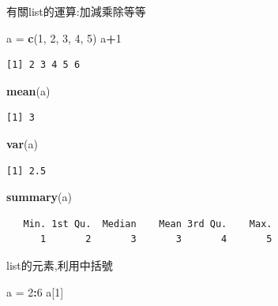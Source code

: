 \documentclass[]{book}
\newenvironment{Shaded}{\begin{snugshade}}{\end{snugshade}}
\newcommand{\DecValTok}[1]{\textcolor[rgb]{0.00,0.00,0.81}{#1}}
\newcommand{\KeywordTok}[1]{\textcolor[rgb]{0.13,0.29,0.53}{\textbf{#1}}}
\newcommand{\NormalTok}[1]{#1}
\newcommand{\OperatorTok}[1]{\textcolor[rgb]{0.81,0.36,0.00}{\textbf{#1}}}
\newcommand{\StringTok}[1]{\textcolor[rgb]{0.31,0.60,0.02}{#1}}
\theoremstyle{definition}
\theoremstyle{definition}
\theoremstyle{definition}
\theoremstyle{remark}
\begin{document}
有關list的運算:加減乘除等等

\begin{Shaded}
\begin{Highlighting}[]
\NormalTok{a =}\StringTok{ }\KeywordTok{c}\NormalTok{(}\DecValTok{1}\NormalTok{, }\DecValTok{2}\NormalTok{, }\DecValTok{3}\NormalTok{, }\DecValTok{4}\NormalTok{, }\DecValTok{5}\NormalTok{)}
\NormalTok{a}\OperatorTok{+}\DecValTok{1}
\end{Highlighting}
\end{Shaded}

\begin{verbatim}
[1] 2 3 4 5 6
\end{verbatim}

\begin{Shaded}
\begin{Highlighting}[]
\KeywordTok{mean}\NormalTok{(a)}
\end{Highlighting}
\end{Shaded}

\begin{verbatim}
[1] 3
\end{verbatim}

\begin{Shaded}
\begin{Highlighting}[]
\KeywordTok{var}\NormalTok{(a)}
\end{Highlighting}
\end{Shaded}

\begin{verbatim}
[1] 2.5
\end{verbatim}

\begin{Shaded}
\begin{Highlighting}[]
\KeywordTok{summary}\NormalTok{(a)}
\end{Highlighting}
\end{Shaded}

\begin{verbatim}
   Min. 1st Qu.  Median    Mean 3rd Qu.    Max. 
      1       2       3       3       4       5 
\end{verbatim}

list的元素,利用中括號

\begin{Shaded}
\begin{Highlighting}[]
\NormalTok{a =}\StringTok{ }\DecValTok{2}\OperatorTok{:}\DecValTok{6}
\NormalTok{a[}\DecValTok{1}\NormalTok{]}
\end{Highlighting}
\end{Shaded}
\end{document}
